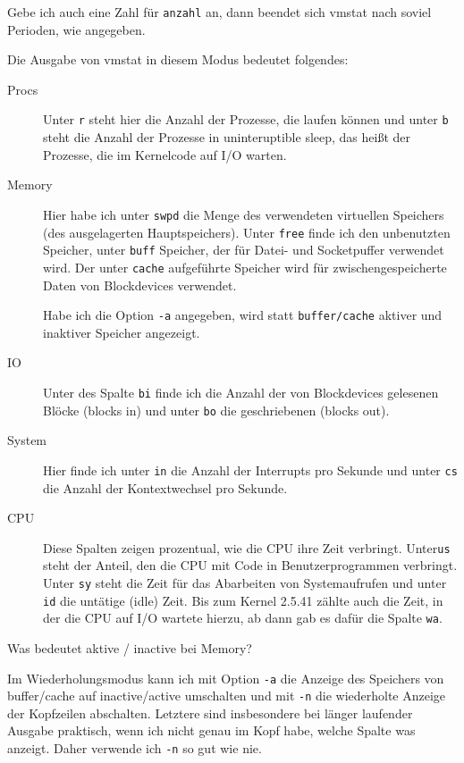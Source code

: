 \begin{normaltext}
  Gebe ich auch eine Zahl für \verb?anzahl? an, dann beendet sich vmstat nach
  soviel Perioden, wie angegeben.

  Die Ausgabe von vmstat in diesem Modus bedeutet folgendes:
  \begin{description}
    \item[Procs] Unter \verb?r? steht hier die Anzahl der Prozesse, die laufen
      können und unter \verb?b? steht die Anzahl der Prozesse in
      uninteruptible sleep, das heißt der Prozesse, die im Kernelcode auf I/O
      warten.
    \item[Memory] Hier habe ich unter \verb?swpd? die Menge des verwendeten
      virtuellen Speichers (des ausgelagerten Hauptspeichers). Unter
      \verb?free? finde ich den unbenutzten Speicher, unter \verb?buff?
      Speicher, der für Datei- und Socketpuffer verwendet wird. Der unter
      \verb?cache? aufgeführte Speicher wird für zwischengespeicherte Daten
      von Blockdevices verwendet.

      Habe ich die Option \verb?-a? angegeben, wird statt \verb?buffer/cache?
      aktiver und inaktiver Speicher angezeigt.
    \item[IO] Unter des Spalte \verb?bi? finde ich die Anzahl der von
      Blockdevices gelesenen Blöcke (blocks in) und unter \verb?bo? die
      geschriebenen (blocks out).
    \item[System] Hier finde ich unter \verb?in? die Anzahl der Interrupts pro
      Sekunde und unter \verb?cs? die Anzahl der Kontextwechsel pro Sekunde.
    \item[CPU] Diese Spalten zeigen prozentual, wie die CPU ihre Zeit
      verbringt. Unter\verb?us? steht der Anteil, den die CPU mit Code in
      Benutzerprogrammen verbringt. Unter \verb?sy? steht die Zeit für das
      Abarbeiten von Systemaufrufen und unter \verb?id? die untätige (idle)
      Zeit. Bis zum Kernel 2.5.41 zählte auch die Zeit, in der die CPU auf I/O
      wartete hierzu, ab dann gab es dafür die Spalte \verb?wa?.
  \end{description}
  \begin{notes}
  \item Was bedeutet aktive / inactive bei Memory?
  \end{notes}

  Im Wiederholungsmodus kann ich mit Option \verb?-a? die Anzeige des Speichers von
  buffer/cache auf inactive/active umschalten und mit \verb?-n? die
  wiederholte Anzeige der Kopfzeilen abschalten. Letztere sind insbesondere
  bei länger laufender Ausgabe praktisch, wenn ich nicht genau im Kopf habe,
  welche Spalte was anzeigt. Daher verwende ich \verb?-n? so gut wie nie.


\end{normaltext}
